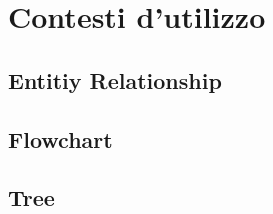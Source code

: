 \chapter{Contesti d'utilizzo}
    \section{Entitiy Relationship}
    \section{Flowchart}
    \section{Tree}